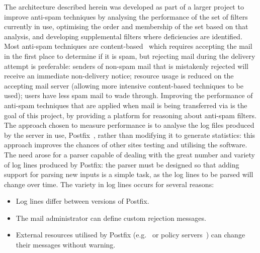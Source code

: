 \documentclass{svmult}
\begin{document}
The architecture described herein was developed as part of a larger project
to improve anti-spam techniques by analysing the performance of the set of
filters currently in use, optimising the order and membership of the set
based on that analysis, and developing supplemental filters where
deficiencies are identified.  Most anti-spam techniques are
content-based~\cite{a-plan-for-spam, word-stemming, relaxed-online-svms}
which requires accepting the mail in the first place to determine if it is
spam, but rejecting mail during the delivery attempt is preferable: senders
of non-spam mail that is mistakenly rejected will receive an immediate
non-delivery notice; resource usage is reduced on the accepting mail server
(allowing more intensive content-based techniques to be used); users have
less spam mail to wade through.  Improving the performance of anti-spam
techniques that are applied when mail is being transferred via
\SMTP{}\footnotemark{} is the goal of this project, by providing a platform
for reasoning about anti-spam filters.  The approach chosen to measure
performance is to analyse the log files produced by the \SMTP{} server in
use, Postfix~\cite{postfix}, rather than modifying it to generate
statistics: this approach improves the chances of other sites testing and
utilising the software.  The need arose for a parser capable of dealing
with the great number and variety of log lines produced by Postfix: the
parser must be designed so that adding support for parsing new inputs is a
simple task, as the log lines to be parsed will change over time.  The
variety in log lines occurs for several reasons:

\begin{itemize}

    \item Log lines differ between versions of Postfix.
        
    \item The mail administrator can define custom rejection messages.

    \item External resources utilised by Postfix (e.g.\ \DNSBL{} or policy
        servers~\cite{policy-servers}) can change their messages without
        warning.

\end{itemize}
\end{document}
